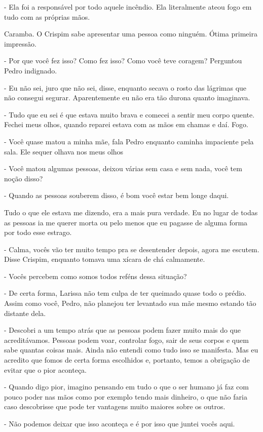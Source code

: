 - Ela foi a responsável por todo aquele incêndio. Ela literalmente ateou fogo em tudo com as próprias mãos.

Caramba. O Crispim sabe apresentar uma pessoa como ninguém. Ótima primeira impressão.

- Por que você fez isso? Como fez isso? Como você teve coragem? Perguntou Pedro indignado.

- Eu não sei, juro que não sei, disse, enquanto secava o rosto das lágrimas que não consegui segurar. Aparentemente eu não era tão durona quanto imaginava.

- Tudo que eu sei é que estava muito brava e comecei a sentir meu corpo quente. Fechei meus olhos, quando reparei estava com as mãos em chamas e daí. Fogo.

- Você quase matou a minha mãe, fala Pedro enquanto caminha impaciente pela sala. Ele sequer olhava nos meus olhos

- Você matou algumas pessoas, deixou várias sem casa e sem nada, você tem noção disso?

- Quando as pessoas souberem disso, é bom você estar bem longe daqui.

Tudo o que ele estava me dizendo, era a mais pura verdade. Eu no lugar de todas as pessoas ia me querer morta ou pelo menos que eu pagasse de alguma forma por todo esse estrago.

- Calma, vocês vão ter muito tempo pra se desentender depois, agora me escutem. Disse Crispim, enquanto tomava uma xícara de chá calmamente. 

- Vocês percebem como somos todos reféns dessa situação? 

- De certa forma, Larissa não tem culpa de ter queimado quase todo o prédio. Assim como você, Pedro, não planejou ter levantado sua mãe mesmo estando tão distante dela.

- Descobri a um tempo atrás que as pessoas podem fazer muito mais do que acreditávamos. Pessoas podem voar, controlar fogo, sair de seus corpos e quem sabe quantas coisas mais. Ainda não entendi como tudo isso se manifesta. Mas eu acredito que fomos de certa forma escolhidos e, portanto, temos a obrigação de evitar que o pior aconteça.

- Quando digo pior, imagino pensando em tudo o que o ser humano já faz com pouco poder nas mãos como por exemplo tendo mais dinheiro, o que não faria caso descobrisse que pode ter vantagens muito maiores sobre os outros.

- Não podemos deixar que isso aconteça e é por isso que juntei vocês aqui.

